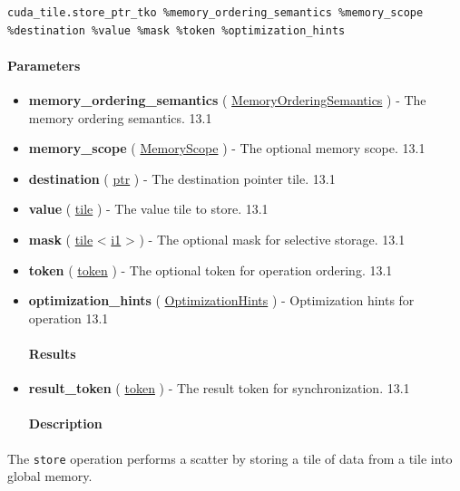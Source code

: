 \documentclass{article}
\begin{document}
\begin{lstlisting}
cuda_tile.store_ptr_tko %memory_ordering_semantics %memory_scope %destination %value %mask %token %optimization_hints
\end{lstlisting}

\paragraph{Parameters}

\begin{itemize}
\item \textbf{memory\_ordering\_semantics} ( \href{https://docs.nvidia.com/cuda/tile-ir/latest/sections/operations.html#op-attribute-cuda-tile-store-ptr-tko-memoryorderingsemantics-attr}{MemoryOrderingSemantics} ) - The memory ordering semantics. 13.1
\item \textbf{memory\_scope} ( \href{https://docs.nvidia.com/cuda/tile-ir/latest/sections/operations.html#op-attribute-cuda-tile-store-ptr-tko-memoryscope-attr}{MemoryScope} ) - The optional memory scope. 13.1
\item \textbf{destination} ( \href{https://docs.nvidia.com/cuda/tile-ir/latest/sections/types.html#type-ptr}{ptr} ) - The destination pointer tile. 13.1
\item \textbf{value} ( \href{https://docs.nvidia.com/cuda/tile-ir/latest/sections/types.html#type-tile}{tile} ) - The value tile to store. 13.1
\item \textbf{mask} ( \href{https://docs.nvidia.com/cuda/tile-ir/latest/sections/types.html#type-tile}{tile} < \href{https://docs.nvidia.com/cuda/tile-ir/latest/sections/types.html#subsection-element-types}{i1} > ) - The optional mask for selective storage. 13.1
\item \textbf{token} ( \href{https://docs.nvidia.com/cuda/tile-ir/latest/sections/operations.html#type-token}{token} ) - The optional token for operation ordering. 13.1
\item \textbf{optimization\_hints} ( \href{https://docs.nvidia.com/cuda/tile-ir/latest/sections/operations.html#op-attribute-cuda-tile-store-ptr-tko-optimizationhints-attr}{OptimizationHints} ) - Optimization hints for operation 13.1


\paragraph{Results}

\item \textbf{result\_token} ( \href{https://docs.nvidia.com/cuda/tile-ir/latest/sections/operations.html#type-token}{token} ) - The result token for synchronization. 13.1


\paragraph{Description}

\end{itemize}
The \texttt{store} operation performs a scatter by storing a tile of data from a tile into global memory.
\end{document}
